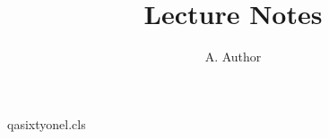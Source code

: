 \begin{filecontents*}[overwrite]{qasixtyonel.cls}
\newcommand\phone[1]{\gdef\@phone{#1}}
\newcommand\mail[1]{\gdef\@mail{#1}}
\newcommand\altmail[1]{\gdef\@altmail{#1}}
\renewcommand\@maketitle{\begin{center}{\LARGE \@title\par}{\large \@author\par}\end{center}
  E-mail: \@mail, tel.\ \@phone\par
  \textbf{E-mail:} \texttt{\@altmail} \@phone\par}
\end{filecontents*}
\documentclass{qasixtyonel}
\title{Lecture Notes}
\author{A. Author}

\maketitle
Text.

